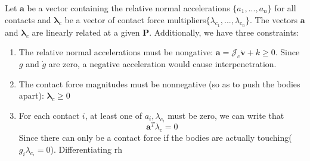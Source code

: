         Let $\pmb{a}$ be a vector containing the relative normal accelerations $\{a_1,...,a_n\}$ for all contacts and $\pmb{\lambda}_c$ be a vector of contact force multipliers$\{\lambda_{c_1},..., \lambda_{c_n}\}$. The vectors $\pmb{a}$ and $\pmb{\lambda}_c$ are linearly related at a given $\mathbf{P}$. Additionally, we have three constraints:
        \begin{enumerate}
            \item The relative normal accelerations must be nongative: $\pmb{a} = \mathcal{J}_c\dot{\mathbf{v}}+k \ge 0$. Since $g$ and $\dot{g}$ are zero, a negative acceleration would cause interpenetration.
            \item The contact force magnitudes must be nonnegative (so as to push the bodies apart): $\pmb{\lambda}_c \ge 0$
            \item For each contact $i$, at least one of $a_i, \lambda_{c_i}$ must be zero, we can write that
            \begin{equation}
                \pmb{a}^{T}\lambda_{c} = 0
            \end{equation}
            Since there can only be a contact force if the bodies are actually touching($g_i\lambda_{c_i} = 0$). Differentiating rh
        \end{enumerate}

        \subsection{}